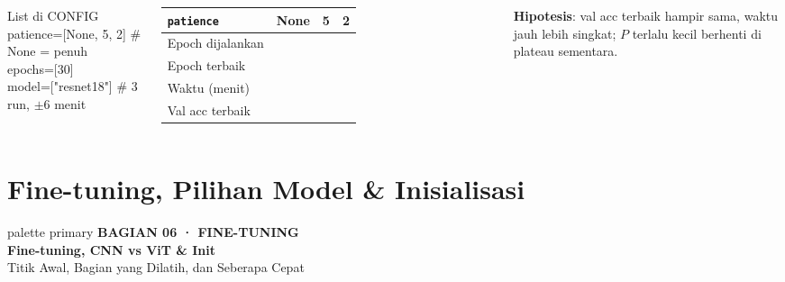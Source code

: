 \documentclass[t,aspectratio=169,xcolor={dvipsnames,table}]{beamer}
\newcommand{\bagian}[3]{%
\begin{frame}[plain]
  \begin{beamercolorbox}[wd=\paperwidth,ht=\paperheight,sep=1.5cm]{palette primary}
    \vspace{1.5cm}
    {\scriptsize\bfseries\color{dlMute}#1}\\[0.4cm]
    {\Huge\bfseries #2}\\[0.4cm]
    {\small\color{dlHairline}#3}
    \vfill
  \end{beamercolorbox}
\end{frame}}
\begin{document}
\begin{frame}
\begin{columns}[T]
        \begin{block}{List di CONFIG}
            {\ttfamily\scriptsize patience=[None, 5, 2]   \# None = penuh\\epochs=[30]\\model=["resnet18"]   \# 3 run, $\pm$6 menit}
        \end{block}
        \vspace{2pt}
        \scriptsize
        \setlength{\tabcolsep}{4pt}
        \renewcommand{\arraystretch}{1.5}
        \begin{tabular}{|l|c|c|c|}
            \rowcolor{dlSoftCloud} \textbf{\texttt{patience}} & \textbf{None} & \textbf{5} & \textbf{2} \\ \hline
            Epoch dijalankan & \hspace{0.75cm} & \hspace{0.75cm} & \hspace{0.75cm} \\ \hline
            Epoch terbaik & \hspace{0.75cm} & \hspace{0.75cm} & \hspace{0.75cm} \\ \hline
            Waktu (menit) & \hspace{0.75cm} & \hspace{0.75cm} & \hspace{0.75cm} \\ \hline
            Val acc terbaik & \hspace{0.75cm} & \hspace{0.75cm} & \hspace{0.75cm} \\ \hline
        \end{tabular}

        \vspace{0.1cm}
        \textbf{Hipotesis}: val acc terbaik hampir sama, waktu jauh lebih singkat; $P$ terlalu kecil berhenti di plateau sementara.
    \end{columns}
\end{frame}

\section{Fine-tuning, Pilihan Model \& Inisialisasi}
\bagian{BAGIAN 06 · FINE-TUNING}{Fine-tuning, CNN vs ViT \& Init}{Titik Awal, Bagian yang Dilatih, dan Seberapa Cepat}
\end{document}
